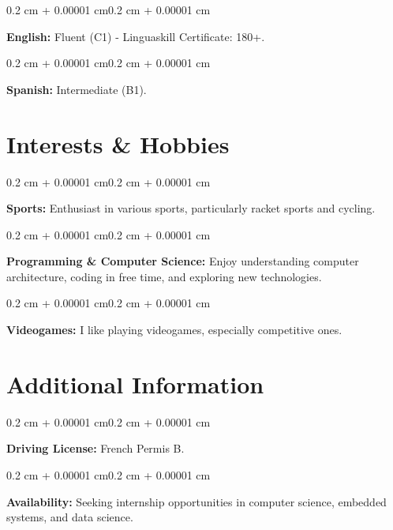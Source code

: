 \documentclass[10pt, a4paper]{article}
\newenvironment{onecolentry}{
    \begin{adjustwidth}{0.2 cm + 0.00001 cm}{0.2 cm + 0.00001 cm}
}{
    \end{adjustwidth}
}
\begin{document}
        \begin{onecolentry}
            \textbf{English:} Fluent (C1) - Linguaskill Certificate: 180+.
        \end{onecolentry}

        \vspace{0.2 cm}

        \begin{onecolentry}
            \textbf{Spanish:} Intermediate (B1).
        \end{onecolentry}

    \section{Interests \& Hobbies}

        \begin{onecolentry}
            \textbf{Sports:} Enthusiast in various sports, particularly racket
            sports and cycling.
        \end{onecolentry}

        \vspace{0.2 cm}

        \begin{onecolentry}
            \textbf{Programming \& Computer Science:} Enjoy understanding
            computer architecture, coding in free time, and exploring new
            technologies.
        \end{onecolentry}

        \vspace{0.2 cm}

        \begin{onecolentry}
            \textbf{Videogames:} I like playing videogames, especially
            competitive ones.
        \end{onecolentry}

    \section{Additional Information}

        \begin{onecolentry}
            \textbf{Driving License:} French Permis B.
        \end{onecolentry}

        \vspace{0.2 cm}

        \begin{onecolentry}
            \textbf{Availability:} Seeking internship opportunities in computer
            science, embedded systems, and data science.
        \end{onecolentry}
\end{document}
